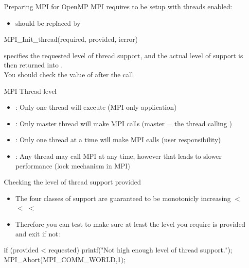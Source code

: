 \documentclass[aspectratio=43]{beamer}
\begin{document}
\begin{frame}[fragile]{Preparing MPI for OpenMP}
MPI requires to be setup with threads enabled:
\begin{itemize}
\item {} should be replaced by 
\end{itemize}
\begin{Pseudolisting}[]{}
MPI_Init_thread(required, provided, ierror)
\end{Pseudolisting}

 specifies the requested level of thread support, and the actual level of support is then returned into .\\
You should check the value of  after the call
\end{frame}

\begin{frame}[fragile]{MPI Thread level}
\begin{itemize}
    \item {}: Only one thread will execute (MPI-only application)
    \item {}: Only master thread will make MPI calls (master = the thread calling )
    \item {}: Only one thread at a time will make MPI calls (user responsibility)
    \item {}: Any thread may call MPI at any time, however that leads to slower performance (lock mechanism in MPI)
\end{itemize}
\end{frame}

\begin{frame}[fragile]{Checking the level of thread support provided}
\begin{itemize}
\item The four classes of support are guaranteed to be monotonicly increasing
  $<$  $<$  $<$ 
\end{itemize}
\begin{itemize}
\item Therefore you can test to make sure at least the level you require is provided and exit if not:
\end{itemize}
\begin{Pseudolisting}[]{}
if (provided < requested) {
     printf("Not high enough level of thread support.\n");
     MPI_Abort(MPI_COMM_WORLD,1);
}
\end{Pseudolisting}
\end{frame}


\end{document}
